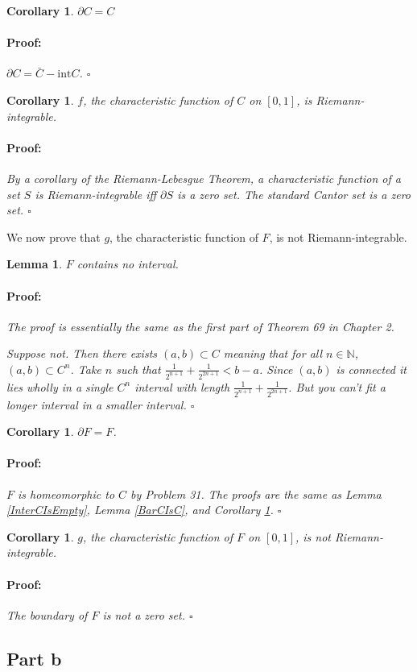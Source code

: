 \documentclass{article}
\newenvironment{proof}{\paragraph{Proof:}}{\hfill$\square$}
\newtheorem{lemma}[theorem]{Lemma}
\newtheorem{corollary}[theorem]{Corollary}
\newcommand{\N}{\mathbb{N}}
\newcommand{\inter}{\text{int}}
\begin{document}
\begin{corollary}
\label{BoundaryCIsC}
$\partial C = C$
\begin{proof}
$\partial C = \bar{C} - \inter C$.
\end{proof}
\end{corollary}

\begin{corollary}
$f$, the characteristic function of $C$ on $[0, 1]$, is Riemann-integrable.
\begin{proof}
By a corollary of the Riemann-Lebesgue Theorem, a characteristic function of a set $S$ is Riemann-integrable iff $\partial S$ is a zero set. The standard Cantor set is a zero set.
\end{proof}
\end{corollary}

We now prove that $g$, the characteristic function of $F$, is not Riemann-integrable.

\begin{lemma}
$F$ contains no interval.
\begin{proof}
The proof is essentially the same as the first part of Theorem 69 in Chapter 2.

Suppose not. Then there exists $(a, b) \subset C$ meaning that for all $n \in \N$, $(a, b) \subset C^n$. Take $n$ such that $\frac{1}{2^{n+1}} + \frac{1}{2^{2n+1}} < b-a$. Since $(a, b)$ is connected it lies wholly in a single $C^n$ interval with length $\frac{1}{2^{n+1}} + \frac{1}{2^{2n+1}}$. But you can't fit a longer interval in a smaller interval.
\end{proof}
\end{lemma}

\begin{corollary}
$\partial F = F$.
\begin{proof}
$F$ is homeomorphic to $C$ by Problem 31. The proofs are the same as Lemma \ref{InterCIsEmpty}, Lemma \ref{BarCIsC}, and Corollary \ref{BoundaryCIsC}.
\end{proof}
\end{corollary}

\begin{corollary}
$g$, the characteristic function of $F$ on $[0, 1]$, is not Riemann-integrable.
\begin{proof}
The boundary of $F$ is not a zero set.
\end{proof}
\end{corollary}

\subsection*{Part b}
\end{document}

